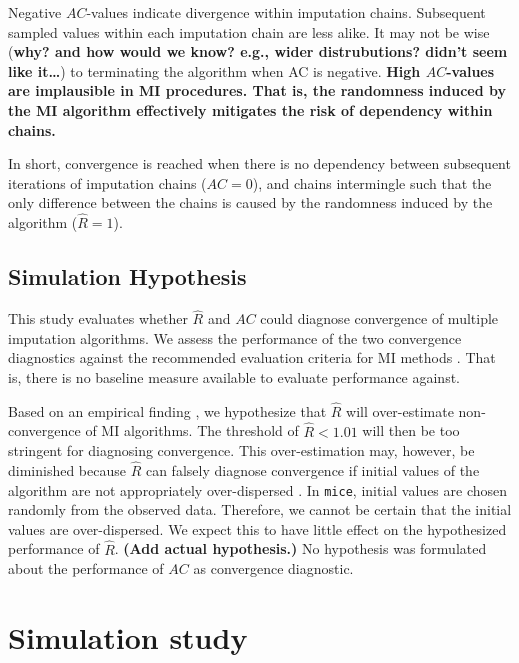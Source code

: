 \documentclass[Royal,times,sageh]{sagej}
\begin{document}
Negative \(AC\)-values indicate divergence within imputation chains.
Subsequent sampled values within each imputation chain are less alike.
It may not be wise (\textbf{why? and how would we know? e.g., wider
distrubutions? didn't seem like it\ldots{}}) to terminating the
algorithm when AC is negative. \textbf{High \(AC\)-values are
implausible in MI procedures. That is, the randomness induced by the MI
algorithm effectively mitigates the risk of dependency within chains.}

In short, convergence is reached when there is no dependency between
subsequent iterations of imputation chains (\(AC = 0\)), and chains
intermingle such that the only difference between the chains is caused
by the randomness induced by the algorithm (\(\widehat{R} = 1\)).

\hypertarget{simulation-hypothesis}{%
\subsection{Simulation Hypothesis}\label{simulation-hypothesis}}

This study evaluates whether \(\widehat{R}\) and \(AC\) could diagnose
convergence of multiple imputation algorithms. We assess the performance
of the two convergence diagnostics against the recommended evaluation
criteria for MI methods \citep[i.e., average bias, average confidence
interval width, and empirical coverage rate across simulations;][\(\S\)
2.5.2]{buur18}. That is, there is no baseline measure available to
evaluate performance against.

Based on an empirical finding \citep{lace07}, we hypothesize that
\(\widehat{R}\) will over-estimate non-convergence of MI algorithms. The
threshold of \(\widehat{R} < 1.01\) will then be too stringent for
diagnosing convergence. This over-estimation may, however, be diminished
because \(\widehat{R}\) can falsely diagnose convergence if initial
values of the algorithm are not appropriately over-dispersed
\citep[p.~437]{broo98}. In \texttt{mice}, initial values are chosen
randomly from the observed data. Therefore, we cannot be certain that
the initial values are over-dispersed. We expect this to have little
effect on the hypothesized performance of \(\widehat{R}\). \textbf{(Add
actual hypothesis.)} No hypothesis was formulated about the performance
of \(AC\) as convergence diagnostic.

\hypertarget{simulation-study}{%
\section{Simulation study}\label{simulation-study}}
\end{document}
